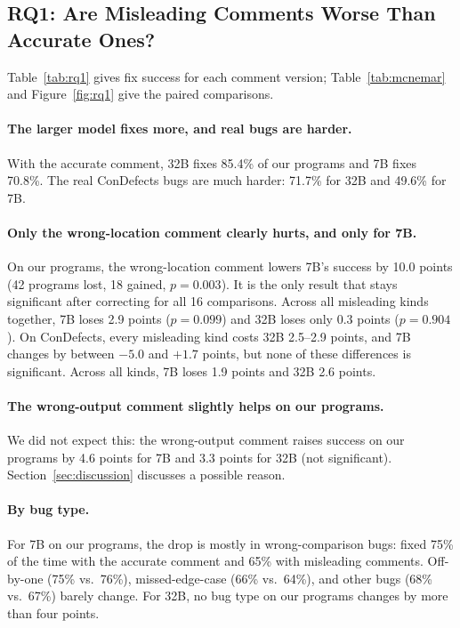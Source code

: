 \documentclass[sigconf,nonacm]{acmart}
\newcommand{\cd}{ConDefects}
\begin{document}
\subsection{RQ1: Are Misleading Comments Worse Than Accurate Ones?}
Table~\ref{tab:rq1} gives fix success for each comment version; Table~\ref{tab:mcnemar} and Figure~\ref{fig:rq1} give the paired comparisons.

\paragraph{The larger model fixes more, and real bugs are harder.} With the accurate comment, 32B fixes 85.4\% of our programs and 7B fixes 70.8\%. The real \cd{} bugs are much harder: 71.7\% for 32B and 49.6\% for 7B.

\paragraph{Only the wrong-location comment clearly hurts, and only for 7B.} On our programs, the wrong-location comment lowers 7B's success by 10.0 points (42 programs lost, 18 gained, $p = 0.003$). It is the only result that stays significant after correcting for all 16 comparisons. Across all misleading kinds together, 7B loses 2.9 points ($p = 0.099$) and 32B loses only 0.3 points ($p = 0.904$). On \cd{}, every misleading kind costs 32B 2.5--2.9 points, and 7B changes by between $-5.0$ and $+1.7$ points, but none of these differences is significant. Across all kinds, 7B loses 1.9 points and 32B 2.6 points.

\paragraph{The wrong-output comment slightly helps on our programs.} We did not expect this: the wrong-output comment raises success on our programs by 4.6 points for 7B and 3.3 points for 32B (not significant). Section~\ref{sec:discussion} discusses a possible reason.

\paragraph{By bug type.} For 7B on our programs, the drop is mostly in wrong-comparison bugs: fixed 75\% of the time with the accurate comment and 65\% with misleading comments. Off-by-one (75\% vs.\ 76\%), missed-edge-case (66\% vs.\ 64\%), and other bugs (68\% vs.\ 67\%) barely change. For 32B, no bug type on our programs changes by more than four points.
\end{document}
